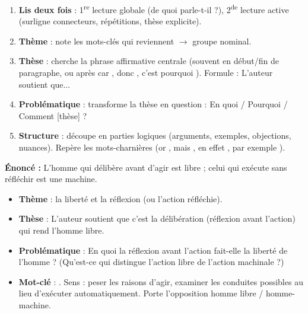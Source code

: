 \documentclass[11pt]{article}
\newcommand{\cle}[1]{{\popxbold\color{popdark}#1}}
\begin{document}
\begin{methode}
\begin{enumerate}
\item \textbf{Lis deux fois} : 1\textsuperscript{re} lecture globale (de quoi parle-t-il ?), 2\textsuperscript{de} lecture active (surligne connecteurs, répétitions, thèse explicite).
\item \textbf{Thème} : note les mots-clés qui reviennent $\rightarrow$ groupe nominal.
\item \textbf{Thèse} : cherche la phrase affirmative centrale (souvent en début/fin de paragraphe, ou après \og car \fg, \og donc \fg, \og c'est pourquoi \fg). Formule : \og L'auteur soutient que... \fg
\item \textbf{Problématique} : transforme la thèse en question : \og En quoi / Pourquoi / Comment [thèse] ? \fg
\item \textbf{Structure} : découpe en parties logiques (arguments, exemples, objections, nuances). Repère les \cle{mots-charnières} (\og or \fg, \og mais \fg, \og en effet \fg, \og par exemple \fg).
\end{enumerate}
\end{methode}

\begin{exoresolu}
\textbf{Énoncé :} \og L'homme qui délibère avant d'agir est libre ; celui qui exécute sans réfléchir est une machine. \fg
\tcblower
\begin{itemize}
\item \textbf{Thème} : la liberté et la réflexion (ou l'action réfléchie).
\item \textbf{Thèse} : L'auteur soutient que c'est la \cle{délibération} (réflexion avant l'action) qui rend l'homme libre.
\item \textbf{Problématique} : En quoi la réflexion avant l'action fait-elle la liberté de l'homme ? (Qu'est-ce qui distingue l'action libre de l'action machinale ?)
\item \textbf{Mot-clé} : \og \cle{délibère} \fg. Sens : peser les raisons d'agir, examiner les conduites possibles au lieu d'exécuter automatiquement. Porte l'opposition homme libre / homme-machine.
\end{itemize}
\end{exoresolu}
\end{document}
